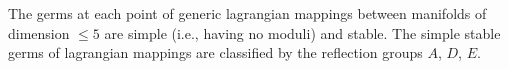 The germs at each point of generic lagrangian mappings between manifolds of dimension $\le 5$ are simple (i.e., having no moduli) and stable. The simple stable germs of lagrangian mappings are classified by the reflection groups $A$, $D$, $E$.
